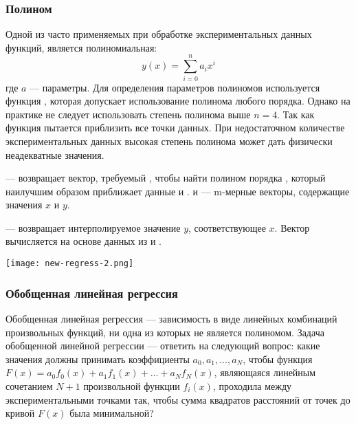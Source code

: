 \subsubsection{Полином}
Одной из  часто применяемых при обработке экспериментальных данных функций, является полиномиальная:
\begin{equation}
y(x)= \sum_{i=0}^{n} a_i x^i
\end{equation}
где $a$ --- параметры. Для определения параметров полиномов используется функция , которая допускает использование полинома любого порядка. Однако на практике не следует использовать степень полинома выше $n = 4$. Так как функция  пытается приблизить все точки данных. При недостаточном количестве экспериментальных данных высокая степень полинома может дать физически неадекватные значения.

 --- возвращает вектор, требуемый , чтобы найти полином порядка , который наилучшим образом приближает данные  и .  и  --- m-мерные векторы, содержащие значения $x$ и $y$.

 --- возвращает интерполируемое значение $y$, соответствующее $x$. Вектор  вычисляется  на основе данных из  и .


\begin{center}
	\texttt{[image: new-regress-2.png]}
\end{center}


\subsubsection{Обобщенная линейная регрессия}
Обобщенная линейная регрессия --- зависимость в виде линейных комбинаций произвольных функций, ни одна из которых не является полиномом.
Задача обобщенной линейной регрессии --- ответить на следующий вопрос: какие значения должны принимать коэффициенты $a_0, a_1, ..., a_N$, чтобы функция  $F(x)=a_0 f_0(x)+a_1 f_1(x)+ ... + a_N f_N(x)$, являющаяся линейным сочетанием $N+1$ произвольной функции $f_i(x)$, проходила между экспериментальными точками так, чтобы сумма квадратов расстояний от точек до кривой $F(x)$ была минимальной?

